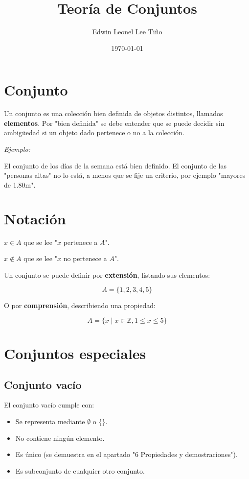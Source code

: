 \documentclass{article}
\title{Teoría de Conjuntos}
\author{Edwin Leonel Lee Tiño}
\date{\today}
\begin{document}
\maketitle

\section{Conjunto}

Un conjunto es una colección bien definida de objetos distintos, llamados \textbf{elementos}. Por "bien definida" se debe entender que se puede decidir sin ambigüedad si un objeto dado pertenece o no a la colección.

\textit{Ejemplo:}

El conjunto de los días de la semana está bien definido. El conjunto de las "personas altas" no lo está, a menos que se fije un criterio, por ejemplo "mayores de 1.80m".

\section{Notación}

$x \in A$ que se lee "$x$ pertenece a $A$".

$x \notin A$ que se lee "$x$ no pertenece a $A$".

Un conjunto se puede definir por \textbf{extensión}, listando sus elementos:

\[A = \{1, 2, 3, 4, 5 \} \]

O por \textbf{comprensión}, describiendo una propiedad:

\[A = \{x \mid x \in \mathbb{Z}, 1 \le x \le 5  \} \]

\section{Conjuntos especiales}

\subsection{Conjunto vacío} 

El conjunto vacío cumple con:

\begin{itemize}
    \item Se representa mediante $\emptyset$ o $\{\}$. 
    \item No contiene ningún elemento.
    \item Es único (se demuestra en el apartado "6 Propiedades y demostraciones").
    \item Es subconjunto de cualquier otro conjunto.
\end{itemize}  
\end{document}
